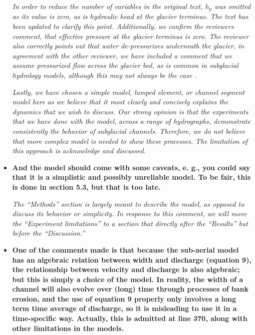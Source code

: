 \documentclass[11pt]{article}
\begin{document}
\begin{itemize}
  \textit{In order to reduce the number of variables in the original text, $h_p$ was omitted as its value is zero, as is hydraulic head at the glacier terminus. The text has been updated to clarify this point.
    Additionally, we confirm the reviewers comment, that effective pressure at the glacier terminus is zero.
    The reviewer also correctly points out that water de-pressurizes underneath the glacier, in agreement with the other reviewer, we have included a comment that we assume pressurized flow across the glacier bed, as is common in subglacial hydrology models, although this may not always be the case \citep{perolo2018}.
  }
  
  \textit{Lastly, we have chosen a simple model, lumped element, or channel segment model here as we believe that it most clearly and concisely explains the dynamics that we wish to discuss.
    Our strong opinion is that the experiments that we have done with the model, across a range of hydrographs, demonstrate consistently the behavior of subglacial channels.
    Therefore, we do not believe that more complex model is needed to show these processes.
    The limitation of this approach is acknowledge and discussed.
  }

\item  \textbf{And the model should come with some caveats, e. g., you could say that it is a simplistic and possibly unreliable model. To be fair, this is done in section 5.3, but that is too late.}

  \textit{The ``Methods'' section is largely meant to describe the model, as opposed to discuss its behavior or simplicity. In response to this comment, we will move the ``Experiment limitations'' to a section that directly after the ``Results'' but before the ``Discussion.''}

  
\item \textbf{  One of the comments made is that because the sub-aerial model has an algebraic relation between width and discharge (equation 9), the relationship between velocity and discharge is also algebraic; but this is simply a choice of the model. In reality, the width of a channel will also evolve over (long) time through processes of bank erosion, and the use of equation 9 properly only involves a long term time average of discharge, so it is misleading to use it in a time-specific way. Actually, this is admitted at line 370, along with other limitations in the models.}



\end{itemize}
\end{document}
